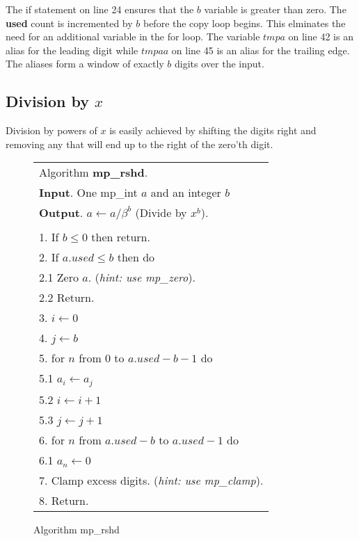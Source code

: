\documentclass[b5paper]{book}
\begin{document}
The if statement on line 24 ensures that the $b$ variable is greater than zero.  The \textbf{used} count is incremented by $b$ before
the copy loop begins.  This elminates the need for an additional variable in the for loop.  The variable $tmpa$ on line 42 is an alias
for the leading digit while $tmpaa$ on line 45 is an alias for the trailing edge.  The aliases form a window of exactly $b$ digits
over the input.  

\subsection{Division by $x$}

Division by powers of $x$ is easily achieved by shifting the digits right and removing any that will end up to the right of the zero'th digit.  

\newpage\begin{figure}[!here]
\begin{small}
\begin{center}
\begin{tabular}{l}
\hline Algorithm \textbf{mp\_rshd}. \\
\textbf{Input}.   One mp\_int $a$ and an integer $b$ \\
\textbf{Output}.  $a \leftarrow a / \beta^b$ (Divide by $x^b$). \\
\hline \\
1.  If $b \le 0$ then return. \\
2.  If $a.used \le b$ then do \\
\hspace{3mm}2.1  Zero $a$.  (\textit{hint: use mp\_zero}). \\
\hspace{3mm}2.2  Return. \\
3.  $i \leftarrow 0$ \\
4.  $j \leftarrow b$ \\
5.  for $n$ from 0 to $a.used - b - 1$ do \\
\hspace{3mm}5.1  $a_i \leftarrow a_j$ \\
\hspace{3mm}5.2  $i \leftarrow i + 1$ \\
\hspace{3mm}5.3  $j \leftarrow j + 1$ \\
6.  for $n$ from $a.used - b$ to $a.used - 1$ do \\
\hspace{3mm}6.1  $a_n \leftarrow 0$ \\
7.  Clamp excess digits.  (\textit{hint: use mp\_clamp}). \\
8.  Return. \\
\hline
\end{tabular}
\end{center}
\end{small}
\caption{Algorithm mp\_rshd}
\end{figure}
\end{document}
